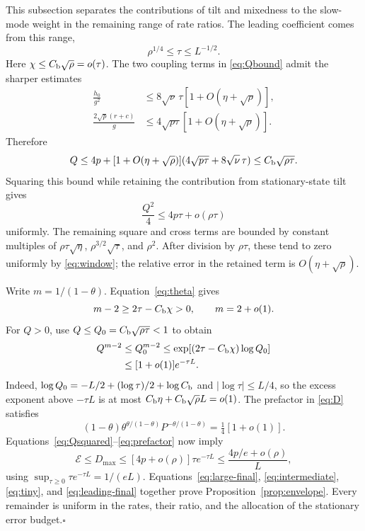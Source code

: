 \documentclass[aps,pra,reprint,amsmath,amssymb,nofootinbib,floatfix,longbibliography]{revtex4-2}
\theoremstyle{aps}
\begin{document}
This subsection separates the contributions of tilt and mixedness to the slow-mode weight in the remaining range of rate ratios. The leading coefficient comes from this range,
\begin{equation}\label{eq:window}
 \rho^{1/4}\le\tau\le L^{-1/2}.
\end{equation}
Here $\chi\le C_{\rm b}\sqrt\rho=o(\tau)$. The two coupling terms in \eqref{eq:Qbound} admit the sharper estimates
\begin{equation}\label{eq:sharpQparts}
 \begin{aligned}
 \frac{h_0}{g^2}
 &\le8\sqrt\nu\,\tau[1+O(\eta+\sqrt\rho)],\\
 \frac{2\sqrt p(r+c)}g
 &\le4\sqrt{p\tau}[1+O(\eta+\sqrt\rho)].
 \end{aligned}
\end{equation}
Therefore
\begin{equation}\label{eq:sharpQ}
 Q\le4p+[1+O(\eta+\sqrt\rho)]
 (4\sqrt{p\tau}+8\sqrt\nu\,\tau)
 \le C_{\rm b}\sqrt{\rho\tau}.
\end{equation}
Squaring this bound while retaining the contribution from stationary-state tilt gives
\begin{equation}\label{eq:Qsquared}
 \frac{Q^2}{4}\le4p\tau+o(\rho\tau)
\end{equation}
uniformly. The remaining square and cross terms are bounded by constant multiples of
$\rho\tau\sqrt\eta$, $\rho^{3/2}\sqrt\tau$, and $\rho^2$. After division by $\rho\tau$, these tend to zero uniformly by \eqref{eq:window}; the relative error in the retained term is $O(\eta+\sqrt\rho)$.

Write $m=1/(1-\theta)$. Equation~\eqref{eq:theta} gives
\begin{equation}\label{eq:mexp}
 m-2\ge2\tau-C_{\rm b}\chi>0,\qquad m=2+o(1).
\end{equation}
For $Q>0$, use $Q\le Q_0=C_{\rm b}\sqrt{\rho\tau}<1$ to obtain
\begin{align}
 Q^{m-2}&\le Q_0^{m-2}
 \le\exp[(2\tau-C_{\rm b}\chi)\log Q_0]\nonumber\\
 &\le[1+o(1)]e^{-\tau L}.\label{eq:extra-exponent}
\end{align}
Indeed, $\log Q_0=-L/2+(\log\tau)/2+\log C_{\rm b}$ and $|\log\tau|\le L/4$, so the excess exponent above $-\tau L$ is at most $C_{\rm b}\eta+C_{\rm b}\sqrt\rho L=o(1)$. The prefactor in \eqref{eq:D} satisfies
\begin{equation}\label{eq:prefactor}
 (1-\theta)\theta^{\theta/(1-\theta)}
 P^{-\theta/(1-\theta)}=\tfrac14[1+o(1)].
\end{equation}
Equations~\eqref{eq:Qsquared}--\eqref{eq:prefactor} now imply
\begin{equation}\label{eq:leading-final}
 \mathcal E\le D_{\max}\le[4p+o(\rho)]\tau e^{-\tau L}
 \le\frac{4p/e+o(\rho)}L,
\end{equation}
using $\sup_{\tau\ge0}\tau e^{-\tau L}=1/(eL)$. Equations~\eqref{eq:large-final}, \eqref{eq:intermediate}, \eqref{eq:tiny}, and \eqref{eq:leading-final} together prove Proposition~\ref{prop:envelope}. Every remainder is uniform in the rates, their ratio, and the allocation of the stationary error budget.\hfill$\square$
\end{document}
